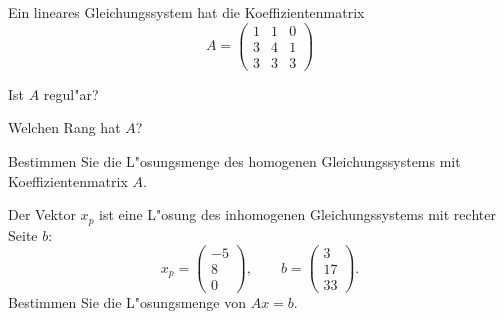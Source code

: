 Ein lineares Gleichungssystem hat die Koeffizientenmatrix
\[
A=\begin{pmatrix}
1&1&0\\
3&4&1\\
3&3&3
\end{pmatrix}
\]
\begin{teilaufgaben}
\item Ist $A$ regul"ar?
\item Welchen Rang hat $A$?
\item Bestimmen Sie die L"osungsmenge des homogenen Gleichungssystems mit
Koeffizientenmatrix $A$.
\item Der Vektor $x_p$ ist eine L"osung des inhomogenen Gleichungssystems mit
rechter Seite $b$:
\[
x_p=
\begin{pmatrix}
-5\\8\\0
\end{pmatrix}
,\qquad
b=\begin{pmatrix}
3\\17\\33
\end{pmatrix}.
\]
Bestimmen Sie die L"osungsmenge von $Ax=b$.
\end{teilaufgaben}

